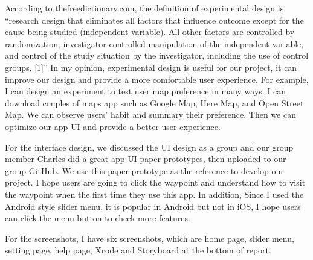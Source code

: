 \documentclass[letterpaper, 10pt,titlepage]{article}
\begin{document}
According to thefreedictionary.com, the definition of experimental design is “research design that eliminates all factors that influence outcome except for the cause being studied (independent variable). All other factors are controlled by randomization, investigator-controlled manipulation of the independent variable, and control of the study situation by the investigator, including the use of control groups. [1]” In my opinion, experimental design is useful for our project, it can improve our design and provide a more comfortable user experience. For example, I can design an experiment to test user map preference in many ways. I can download couples of maps app such as Google Map, Here Map, and Open Street Map. We can observe users’ habit and summary their preference. Then we can optimize our app UI and provide a better user experience.
 
For the interface design, we discussed the UI design as a group and our group member Charles did a great app UI paper prototypes, then uploaded to our group GitHub. We use this paper prototype as the reference to develop our project. I hope users are going to click the waypoint and understand how to visit the waypoint when the first time they use this app. In addition, Since I used the Android style slider menu, it is popular in Android but not in iOS, I hope users can click the menu button to check more features.
 
For the screenshots, I have six screenshots, which are home page, slider menu, setting page, help page, Xcode and Storyboard at the bottom of report. 
\end{document}
